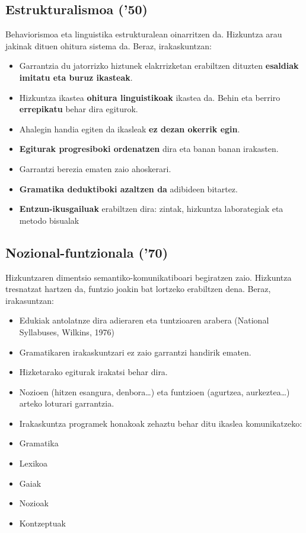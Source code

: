 \documentclass[
]{book}
\providecommand{\tightlist}{%
  \setlength{\itemsep}{0pt}\setlength{\parskip}{0pt}}
\begin{document}
\hypertarget{estrukturalismoa-50}{%
\subsection{Estrukturalismoa ('50)}\label{estrukturalismoa-50}}

Behaviorismoa eta linguistika estrukturalean oinarritzen da. Hizkuntza arau jakinak dituen ohitura sistema da. Beraz, irakaskuntzan:

\begin{itemize}
\tightlist
\item
  Garrantzia du jatorrizko hiztunek elakrrizketan erabiltzen dituzten \textbf{esaldiak imitatu eta buruz ikasteak}.
\item
  Hizkuntza ikastea \textbf{ohitura linguistikoak} ikastea da. Behin eta berriro \textbf{errepikatu} behar dira egiturok.
\item
  Ahalegin handia egiten da ikasleak \textbf{ez dezan okerrik egin}.
\item
  \textbf{Egiturak progresiboki ordenatzen} dira eta banan banan irakasten.
\item
  Garrantzi berezia ematen zaio ahoskerari.
\item
  \textbf{Gramatika deduktiboki azaltzen da} adibideen bitartez.
\item
  \textbf{Entzun-ikusgailuak} erabiltzen dira: zintak, hizkuntza laborategiak eta metodo bisualak
\end{itemize}

\hypertarget{nozional-funtzionala-70}{%
\subsection{Nozional-funtzionala ('70)}\label{nozional-funtzionala-70}}

Hizkuntzaren dimentsio semantiko-komunikatiboari begiratzen zaio. Hizkuntza tresnatzat hartzen da, funtzio joakin bat lortzeko erabiltzen dena. Beraz, irakasuntzan:

\begin{itemize}
\tightlist
\item
  Edukiak antolatnze dira adieraren eta tuntzioaren arabera (National Syllabuses, Wilkins, 1976)
\item
  Gramatikaren irakaskuntzari ez zaio garrantzi handirik ematen.
\item
  Hizketarako egiturak irakatsi behar dira.
\item
  Nozioen (hitzen esangura, denbora\ldots) eta funtzioen (agurtzea, aurkeztea\ldots) arteko loturari garrantzia.
\item
  Irakaskuntza programek honakoak zehaztu behar ditu ikaslea komunikatzeko:
\item
  Gramatika
\item
  Lexikoa
\item
  Gaiak
\item
  Nozioak
\item
  Kontzeptuak
\end{itemize}
\end{document}
